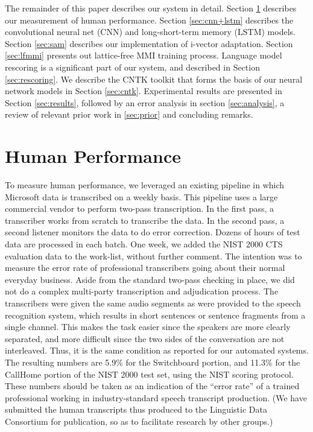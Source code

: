 \documentclass{article}
\begin{document}
The remainder of this paper describes our system in detail.
Section \ref{sec:human} describes our measurement of human performance. 
Section \ref{sec:cnn+lstm} describes the convolutional neural net (CNN) and long-short-term memory (LSTM) models.
Section \ref{sec:sam} describes our implementation of i-vector adaptation. Section \ref{sec:lfmmi}
presents out lattice-free MMI training process.
Language model rescoring is a significant part of our system, and described in Section \ref{sec:rescoring}.
We describe the CNTK toolkit that forms the basis of our neural network models in Section \ref{sec:cntk}. 
Experimental results are presented in Section \ref{sec:results}, followed
by an error analysis in section \ref{sec:analysis}, 
a review of relevant prior work in \ref{sec:prior} and concluding remarks.
\section{Human Performance}
\label{sec:human}
To measure human performance, we leveraged an existing pipeline in which 
Microsoft data is transcribed on a weekly basis. This pipeline uses 
a large commercial vendor to perform two-pass transcription. In the first pass,
a transcriber works from scratch to transcribe the data. In the second pass,
a second listener monitors the data to do error correction. Dozens of hours
of test data are processed in each batch. 
One week, we added the NIST 2000 CTS evaluation data to the work-list, without 
further comment. The intention was to measure the error rate of 
professional transcribers going about their normal everyday business.
Aside from the standard two-pass checking in place, we did not do 
a complex multi-party transcription and adjudication 
process. The transcribers were given the same audio segments as were
provided to the speech recognition system, which results in 
short sentences or sentence fragments from a single channel. This makes
the task easier since the speakers are more clearly separated, and more
difficult since the two sides of the conversation are not interleaved. Thus, it 
is the same condition as reported for our automated systems. 
The resulting numbers are 5.9\% for the Switchboard portion,
and 11.3\% for the CallHome portion of the NIST 2000 test set,
using the NIST scoring protocol.
These numbers should be
taken as an indication of the ``error rate'' of a trained professional 
working in industry-standard speech transcript production.
(We have submitted the human transcripts thus produced to the Linguistic Data Consortium
for publication, so as to facilitate research by other groups.)
\end{document}
